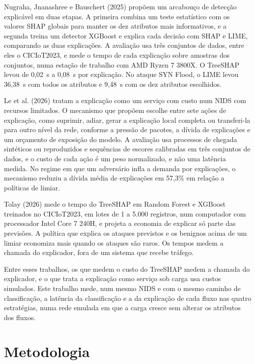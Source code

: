 \documentclass[
  article,
  12pt,
  oneside,
  a4paper,
  english,
  brazil
]{abntex2}
\begin{document}
Nugraha, Jnanashree e Bauschert (2025) propõem um arcabouço de detecção explicável em duas etapas. A
primeira combina um teste estatístico com os valores SHAP globais para manter os dez atributos mais
informativos, e a segunda treina um detector XGBoost e explica cada decisão com SHAP e LIME,
comparando as duas explicações. A avaliação usa três conjuntos de dados, entre eles o CICIoT2023, e
mede o tempo de cada explicação sobre amostras dos conjuntos, numa estação de trabalho com AMD Ryzen 7
3800X. O TreeSHAP levou de 0,02~s a 0,08~s por explicação. No ataque SYN Flood, o LIME levou 36,38~s
com todos os atributos e 9,48~s com os dez atributos escolhidos.

Le et al. (2026) tratam a explicação como um serviço com custo num NIDS com recursos limitados. O
mecanismo que propõem escolhe entre sete ações de explicação, como suprimir, adiar, gerar a
explicação local completa ou transferi-la para outro nível da rede, conforme a pressão de pacotes, a
dívida de explicações e um orçamento de exposição do modelo. A avaliação usa processos de chegada
sintéticos ou reproduzidos e sequências de escores calibradas em três conjuntos de dados, e o custo
de cada ação é um peso normalizado, e não uma latência medida. No regime em que um adversário infla a
demanda por explicações, o mecanismo reduziu a dívida média de explicações em 57,3\% em relação a
políticas de limiar.

Tolay (2026) mede o tempo do TreeSHAP em Random Forest e XGBoost treinados no CICIoT2023, em lotes
de 1 a 5.000 registros, num computador com processador Intel Core 7 240H, e projeta a economia de
explicar só parte das previsões. A política que explica os ataques previstos e os benignos acima de
um limiar economiza mais quando os ataques são raros. Os tempos medem a chamada do explicador, fora
de um sistema que recebe tráfego.

Entre esses trabalhos, os que medem o custo do TreeSHAP medem a chamada do explicador, e o que trata a
explicação como serviço sob carga usa custos simulados. Este trabalho mede, num mesmo NIDS e com o
mesmo caminho de classificação, a latência da classificação e a da explicação de cada fluxo nas
quatro estratégias, numa rede emulada em que a carga cresce sem alterar os atributos dos fluxos.

\section{Metodologia}
\label{sec:metodologia}
\end{document}
